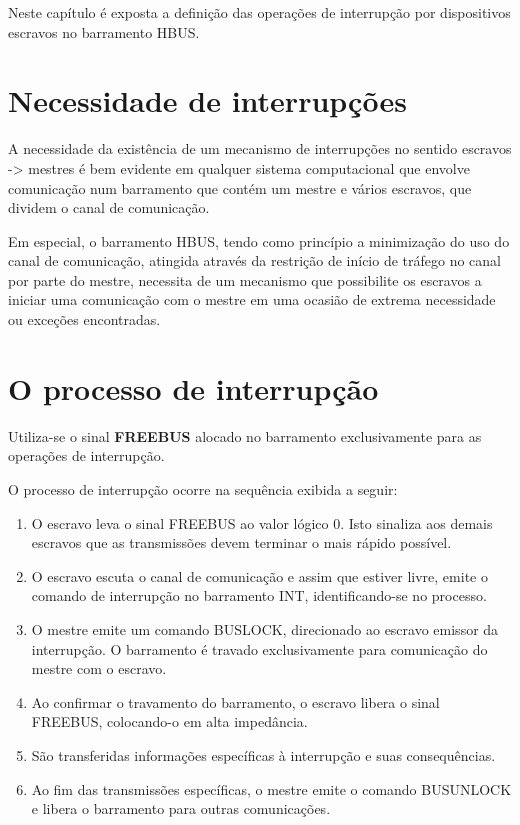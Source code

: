 
Neste capítulo é exposta a definição das operações de interrupção por dispositivos escravos no barramento HBUS.

\section{Necessidade de interrupções}

A necessidade da existência de um mecanismo de interrupções no sentido escravos -> mestres é bem evidente em qualquer sistema computacional que envolve comunicação num barramento que contém um mestre e vários escravos, que dividem o canal de comunicação.

Em especial, o barramento HBUS, tendo como princípio a minimização do uso do canal de comunicação, atingida através da restrição de início de tráfego no canal por parte do mestre, necessita de um mecanismo que possibilite os escravos a iniciar uma comunicação com o mestre em uma ocasião de extrema necessidade ou exceções encontradas.

\section{O processo de interrupção}

Utiliza-se o sinal \textbf{FREEBUS} alocado no barramento exclusivamente para as operações de interrupção.

O processo de interrupção ocorre na sequência exibida a seguir:

\begin{enumerate}

\item O escravo leva o sinal FREEBUS ao valor lógico 0. Isto sinaliza aos demais escravos que as transmissões devem terminar o mais rápido possível.

\item O escravo escuta o canal de comunicação e assim que estiver livre, emite o comando de interrupção no barramento INT, identificando-se no processo.

\item O mestre emite um comando BUSLOCK, direcionado ao escravo emissor da interrupção. O barramento é travado exclusivamente para comunicação do mestre com o escravo.

\item Ao confirmar o travamento do barramento, o escravo libera o sinal FREEBUS, colocando-o em alta impedância.

\item São transferidas informações específicas à interrupção e suas consequências.

\item Ao fim das transmissões específicas, o mestre emite o comando BUSUNLOCK e libera o barramento para outras comunicações.


\end{enumerate}

